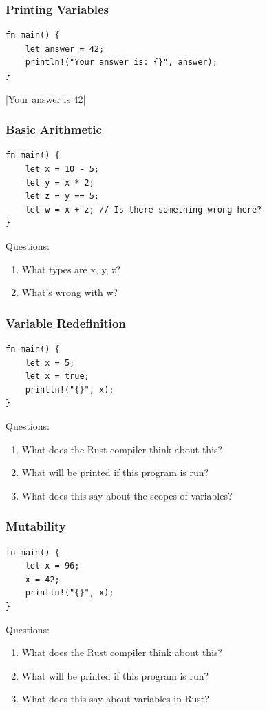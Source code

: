 \documentclass{slides}
\begin{document}
\begin{frame}[fragile]
\frametitle{Printing Variables}
\begin{verbatim}
fn main() {
    let answer = 42;
    println!("Your answer is: {}", answer);
}
\end{verbatim}
|Your answer is 42|
\end{frame}

\begin{frame}[fragile]
\frametitle{Basic Arithmetic}
\begin{verbatim}
fn main() {
    let x = 10 - 5;
    let y = x * 2;
    let z = y == 5;
    let w = x + z; // Is there something wrong here?
}
\end{verbatim}
Questions:
\begin{enumerate}
    \item What types are x, y, z?
    \item What's wrong with w?
\end{enumerate}
\end{frame}

\begin{frame}[fragile]
\frametitle{Variable Redefinition}
\begin{verbatim}
fn main() {
    let x = 5;
    let x = true;
    println!("{}", x);
}
\end{verbatim}
Questions:
\begin{enumerate}
    \item What does the Rust compiler think about this?
    \item What will be printed if this program is run?
    \item What does this say about the scopes of variables?
\end{enumerate}
\end{frame}

\begin{frame}[fragile]
\frametitle{Mutability}
\begin{verbatim}
fn main() {
    let x = 96;
    x = 42;
    println!("{}", x);
}
\end{verbatim}
Questions:
\begin{enumerate}
    \item What does the Rust compiler think about this?
    \item What will be printed if this program is run?
    \item What does this say about variables in Rust?
\end{enumerate}
\end{frame}
\end{document}

